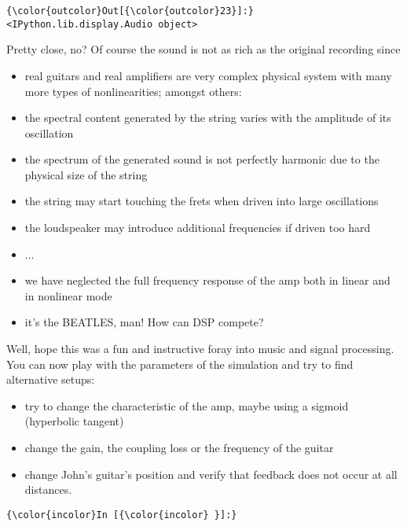 \documentclass[11pt]{article}
\providecommand{\tightlist}{%
      \setlength{\itemsep}{0pt}\setlength{\parskip}{0pt}}
\begin{document}
\begin{Verbatim}[commandchars=\\\{\}]
{\color{outcolor}Out[{\color{outcolor}23}]:} <IPython.lib.display.Audio object>
\end{Verbatim}
            
    Pretty close, no? Of course the sound is not as rich as the original
recording since

\begin{itemize}
\tightlist
\item
  real guitars and real amplifiers are very complex physical system with
  many more types of nonlinearities; amongst others:
\item
  the spectral content generated by the string varies with the amplitude
  of its oscillation
\item
  the spectrum of the generated sound is not perfectly harmonic due to
  the physical size of the string
\item
  the string may start touching the frets when driven into large
  oscillations
\item
  the loudspeaker may introduce additional frequencies if driven too
  hard
\item
  ...
\item
  we have neglected the full frequency response of the amp both in
  linear and in nonlinear mode
\item
  it's the BEATLES, man! How can DSP compete?
\end{itemize}

Well, hope this was a fun and instructive foray into music and signal
processing. You can now play with the parameters of the simulation and
try to find alternative setups:

\begin{itemize}
\tightlist
\item
  try to change the characteristic of the amp, maybe using a sigmoid
  (hyperbolic tangent)
\item
  change the gain, the coupling loss or the frequency of the guitar
\item
  change John's guitar's position and verify that feedback does not
  occur at all distances.
\end{itemize}

    \begin{Verbatim}[commandchars=\\\{\}]
{\color{incolor}In [{\color{incolor} }]:} 
\end{Verbatim}



    
    
    
    
\end{document}
